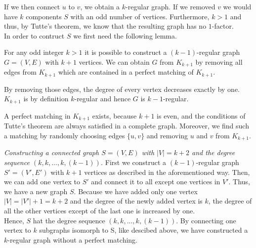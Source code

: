 \documentclass[a4paper]{article}
\begin{document}
\begin{solution}{11}
		If we then connect $u$ to $v$, we obtain a $k$-regular graph. If we removed $v$ we would have $k$ components $S$ with an odd number of vertices. Furthermore, $k > 1$ and thus, by Tutte's theorem, we know that the resulting graph has no $1$-factor.\\
		
		In order to contruct $S$ we first need the following lemma.
		\begin{lemma}{For any odd integer $k > 1$ it is possible to construct a $(k-1)$-regular graph $G=(V,E)$ with $k+1$ vertices.}
			We can obtain $G$ from $K_{k+1}$ by removing all edges from $K_{k+1}$ which are contained in a perfect matching of $K_{k+1}$. 

			By removing those edges, the degree of every vertex decreases exactly by one. 
			$K_{k+1}$ is by definition $k$-regular and hence $G$ is $k-1$-regular.

			A perfect matching in $K_{k+1}$ exists, because $k+1$ is even, and the conditions of Tutte's theorem are always satisfied in a complete graph. Moreover, we find such a matching by randomly choosing edges $\{u,v\}$ and removing $u$ and $v$ from $K_{k+1}$. 
		\end{lemma}
		
		\emph{Constructing a connected graph $S=(V,E)$ with $|V|=k+2$ and the degree sequence $( k,k,...,k,(k-1))$. }  
		First we construct a $(k-1)$-regular graph $S' = (V',E')$ with $k+1$ vertices as described in the aforementioned way. Then, we can add one vertex to $S'$ and connect it to all except one vertices in $V'$. Thus, we have a new graph $S$. 
		Because we have added only one vertex $|V| = |V'| +1 = k+2$ and the degree of the newly added vertex is $k$, the degree of all the other vertices except of the last one is increased by one.\\

		Hence, $S$ hat the degree sequence $(k,k,...,k,(k-1))$. 
		By connecting one vertex to $k$ subgraphs isomorph to S, like descibed above, we have constructed a $k$-regular graph without a perfect matching.
		\begin{figure}[h]
			\centering
\end{figure}
\end{solution}
\end{document}
